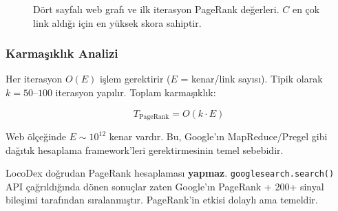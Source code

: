 \begin{figure}[H]
\centering
{}
\caption{D\"{o}rt sayfal{\i} web graf{\i} ve ilk iterasyon PageRank de\u{g}erleri. $C$ en \c{c}ok link ald{\i}\u{g}{\i} i\c{c}in en y\"{u}ksek skora sahiptir.}
\label{fig:pagerank-graph}
\end{figure}

\subsubsection{Karma\c{s}{\i}kl{\i}k Analizi}

Her iterasyon $O(E)$ i\c{s}lem gerektirir ($E$ = kenar/link say{\i}s{\i}). Tipik olarak $k = 50\text{--}100$ iterasyon yap{\i}l{\i}r. Toplam karma\c{s}{\i}kl{\i}k:

\begin{equation}
T_{\text{PageRank}} = O(k \cdot E)
\label{eq:pagerank-complexity}
\end{equation}

\noindent
Web \"{o}l\c{c}e\u{g}inde $E \sim 10^{12}$ kenar vard{\i}r. Bu, Google'{\i}n MapReduce/Pregel gibi da\u{g}{\i}t{\i}k hesaplama framework'leri gerektirmesinin temel sebebidir.

\begin{dikkat}
LocoDex do\u{g}rudan PageRank hesaplamas{\i} \textbf{yapmaz}. \texttt{googlesearch.search()} API \c{c}a\u{g}r{\i}ld{\i}\u{g}{\i}nda d\"{o}nen sonu\c{c}lar zaten Google'{\i}n PageRank + 200+ sinyal bile\c{s}imi taraf{\i}ndan s{\i}ralanm{\i}\c{s}t{\i}r. PageRank'in etkisi dolayl{\i} ama temeldir.
\end{dikkat}


